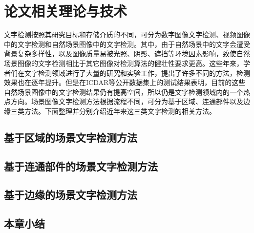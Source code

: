 ﻿%
%
%
%
%
%

\chapter{论文相关理论与技术}

    文字检测按照其研究目标和存储介质的不同，可分为数字图像文字检测、视频图像中的文字检测和自然场景图像中的文字检测。其中，由于自然场景中的文字会遭受背景复杂多样性，以及图像质量易被光照、阴影、遮挡等环境因素影响，致使自然场景图像的文字检测相比于其它图像对检测算法的健壮性要求更高。这些年来，学者们在文字检测领域进行了大量的研究和实验工作，提出了许多不同的方法，检测效果也在逐年提升。但是在ICDAR等公开数据集上的测试结果表明，目前的这些自然场景图像中的文字检测结果仍有提高空间，所以仍是文字检测领域内的一个热点方向。场景图像文字检测方法根据流程不同，可分为基于区域、连通部件以及边缘三类方法。下面整理并分别介绍近年来这三类文字检测的相关方法。

    \section{基于区域的场景文字检测方法}

    \section{基于连通部件的场景文字检测方法}

    \section{基于边缘的场景文字检测方法}

    \section{本章小结}

